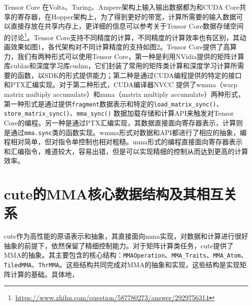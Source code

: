 Tensor Core 在Volta、Turing、Ampere架构上输入输出数据都为和CUDA Core共享的寄存器，在Hopper架构上，为了得到更好的带宽，计算所需要的输入数据可以直接存放在共享内存上，更详细的信息可以参考关于Tensor Core数据存储空间的讨论\footnote{\url{https://www.zhihu.com/question/587780273/answer/2929756314}}。Tensor Core支持不同精度的计算，不同精度的计算效率也有区别，其动画效果如图1，各代架构对不同计算精度的支持如图2。Tensor Core提供了高算力，我们有两种形式可以使用Tensor Core，第一种是利用NVidia提供的矩阵计算库cublas和深度学习库cudnn，它们封装了常用的矩阵类计算和深度学习计算所需要的函数，以SDK的形式提供能力；第二种是通过CUDA编程提供的特定的接口和PTX汇编实现。对于第二种形式，CUDA编译器NVCC 提供了wmma（warp matrix multiply accumulate）和mma（matrix multiply accumulate）两种形式，第一种形式是通过提供\verb|fragment|数据表示和特定的\verb|load_matrix_sync()|、\verb|store_matrix_sync()|、\verb|mma_sync()| 数据加载存储和计算API来触发对Tensor Core的编程。另一种是通过PTX汇编实现，其数据直接面向寄存器表示，计算则是通过\verb|mma.sync|类的函数实现。wmma形式对数据和API都进行了相应的抽象，编程相对简单，但对指令单控制也相对粗糙。mma形式的编程直接面向寄存器表示和汇编指令，难道较大，容易出错，但是可以实现精细的控制从而达到更高的计算效率。

\section{cute的MMA核心数据结构及其相互关系}

cute作为高性能的原语表示和抽象，其直接面向mma实现，对数据和计算进行很好抽象的前提下，依然保留了精细控制能力。对于矩阵计算类任务，cute提供了MMA的抽象。其主要包含的核心结构：\verb|MMAOperation|、\verb|MMA_Traits|、\verb|MMA_Atom|、\verb|TiledMMA|、\verb|ThrMMA|。这些结构共同完成对MMA的抽象和实现，这些结构是实现矩阵计算的基础。具体地，

